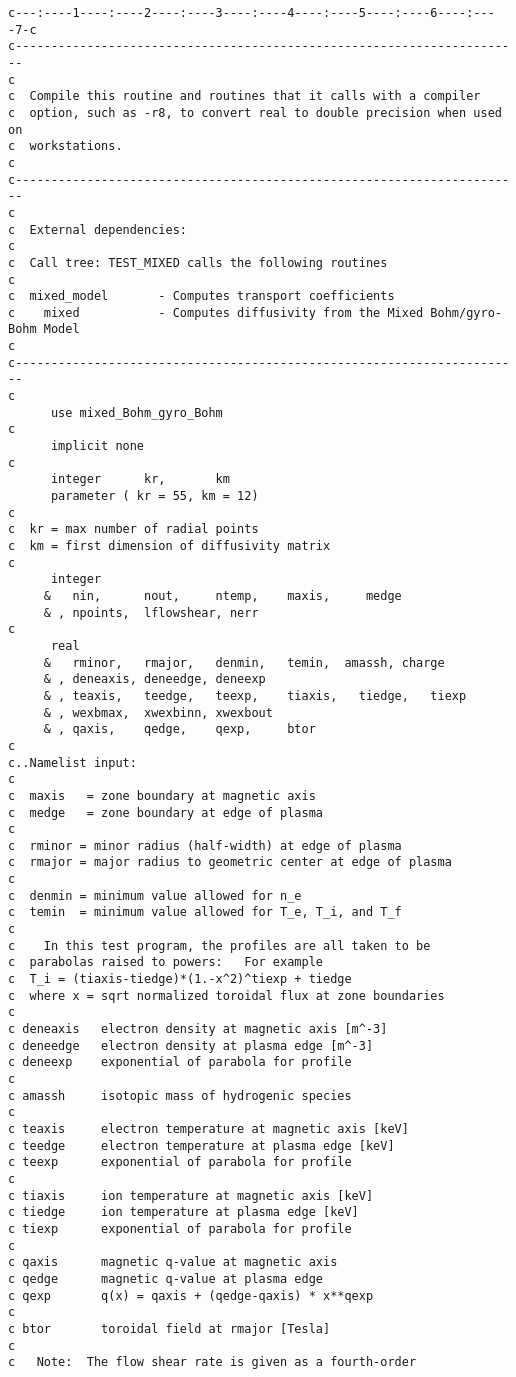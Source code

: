 \begin{verbatim}
c---:----1----:----2----:----3----:----4----:----5----:----6----:----7-c
c-----------------------------------------------------------------------
c
c  Compile this routine and routines that it calls with a compiler
c  option, such as -r8, to convert real to double precision when used on
c  workstations.
c
c-----------------------------------------------------------------------
c
c  External dependencies:
c
c  Call tree: TEST_MIXED calls the following routines
c
c  mixed_model       - Computes transport coefficients
c    mixed           - Computes diffusivity from the Mixed Bohm/gyro-Bohm Model
c
c-----------------------------------------------------------------------
c
      use mixed_Bohm_gyro_Bohm
c
      implicit none
c
      integer      kr,       km
      parameter ( kr = 55, km = 12)
c
c  kr = max number of radial points
c  km = first dimension of diffusivity matrix
c
      integer
     &   nin,      nout,     ntemp,    maxis,     medge
     & , npoints,  lflowshear, nerr
c
      real
     &   rminor,   rmajor,   denmin,   temin,  amassh, charge
     & , deneaxis, deneedge, deneexp
     & , teaxis,   teedge,   teexp,    tiaxis,   tiedge,   tiexp
     & , wexbmax,  xwexbinn, xwexbout
     & , qaxis,    qedge,    qexp,     btor
c
c..Namelist input:
c
c  maxis   = zone boundary at magnetic axis
c  medge   = zone boundary at edge of plasma
c
c  rminor = minor radius (half-width) at edge of plasma
c  rmajor = major radius to geometric center at edge of plasma
c
c  denmin = minimum value allowed for n_e
c  temin  = minimum value allowed for T_e, T_i, and T_f
c
c    In this test program, the profiles are all taken to be
c  parabolas raised to powers:   For example
c  T_i = (tiaxis-tiedge)*(1.-x^2)^tiexp + tiedge
c  where x = sqrt normalized toroidal flux at zone boundaries
c
c deneaxis   electron density at magnetic axis [m^-3]
c deneedge   electron density at plasma edge [m^-3]
c deneexp    exponential of parabola for profile
c
c amassh     isotopic mass of hydrogenic species
c
c teaxis     electron temperature at magnetic axis [keV]
c teedge     electron temperature at plasma edge [keV]
c teexp      exponential of parabola for profile
c
c tiaxis     ion temperature at magnetic axis [keV]
c tiedge     ion temperature at plasma edge [keV]
c tiexp      exponential of parabola for profile
c
c qaxis      magnetic q-value at magnetic axis
c qedge      magnetic q-value at plasma edge
c qexp       q(x) = qaxis + (qedge-qaxis) * x**qexp
c
c btor       toroidal field at rmajor [Tesla]
c
c   Note:  The flow shear rate is given as a fourth-order

\end{verbatim}
